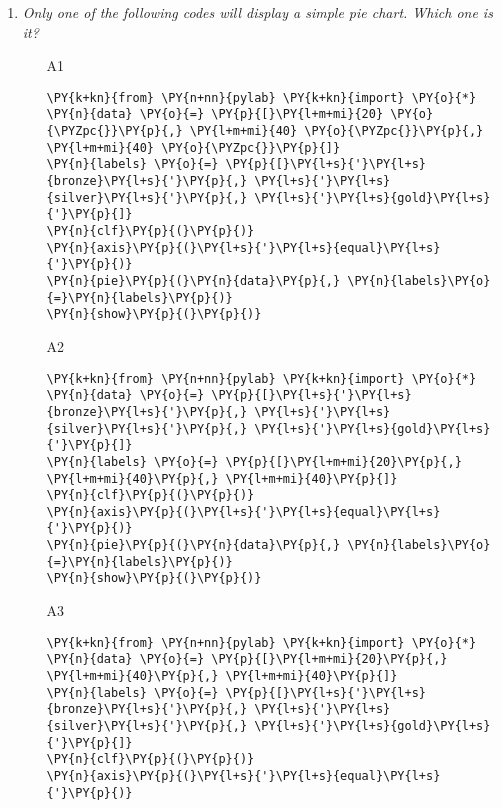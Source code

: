\begin{enumerate}
\vspace{6mm}

\item {\em Only one of the following codes will display a simple pie chart. Which one is it?}\\

\begin{enumerate}
\item[A1] 
\begin{Verbatim}[commandchars=\\\{\}]
\PY{k+kn}{from} \PY{n+nn}{pylab} \PY{k+kn}{import} \PY{o}{*}
\PY{n}{data} \PY{o}{=} \PY{p}{[}\PY{l+m+mi}{20} \PY{o}{\PYZpc{}}\PY{p}{,} \PY{l+m+mi}{40} \PY{o}{\PYZpc{}}\PY{p}{,} \PY{l+m+mi}{40} \PY{o}{\PYZpc{}}\PY{p}{]}
\PY{n}{labels} \PY{o}{=} \PY{p}{[}\PY{l+s}{'}\PY{l+s}{bronze}\PY{l+s}{'}\PY{p}{,} \PY{l+s}{'}\PY{l+s}{silver}\PY{l+s}{'}\PY{p}{,} \PY{l+s}{'}\PY{l+s}{gold}\PY{l+s}{'}\PY{p}{]}
\PY{n}{clf}\PY{p}{(}\PY{p}{)}
\PY{n}{axis}\PY{p}{(}\PY{l+s}{'}\PY{l+s}{equal}\PY{l+s}{'}\PY{p}{)}
\PY{n}{pie}\PY{p}{(}\PY{n}{data}\PY{p}{,} \PY{n}{labels}\PY{o}{=}\PY{n}{labels}\PY{p}{)}
\PY{n}{show}\PY{p}{(}\PY{p}{)}
\end{Verbatim}
\item[A2] 
\begin{Verbatim}[commandchars=\\\{\}]
\PY{k+kn}{from} \PY{n+nn}{pylab} \PY{k+kn}{import} \PY{o}{*}
\PY{n}{data} \PY{o}{=} \PY{p}{[}\PY{l+s}{'}\PY{l+s}{bronze}\PY{l+s}{'}\PY{p}{,} \PY{l+s}{'}\PY{l+s}{silver}\PY{l+s}{'}\PY{p}{,} \PY{l+s}{'}\PY{l+s}{gold}\PY{l+s}{'}\PY{p}{]}
\PY{n}{labels} \PY{o}{=} \PY{p}{[}\PY{l+m+mi}{20}\PY{p}{,} \PY{l+m+mi}{40}\PY{p}{,} \PY{l+m+mi}{40}\PY{p}{]}
\PY{n}{clf}\PY{p}{(}\PY{p}{)}
\PY{n}{axis}\PY{p}{(}\PY{l+s}{'}\PY{l+s}{equal}\PY{l+s}{'}\PY{p}{)}
\PY{n}{pie}\PY{p}{(}\PY{n}{data}\PY{p}{,} \PY{n}{labels}\PY{o}{=}\PY{n}{labels}\PY{p}{)}
\PY{n}{show}\PY{p}{(}\PY{p}{)}
\end{Verbatim}
\item[A3]
\begin{Verbatim}[commandchars=\\\{\}]
\PY{k+kn}{from} \PY{n+nn}{pylab} \PY{k+kn}{import} \PY{o}{*}
\PY{n}{data} \PY{o}{=} \PY{p}{[}\PY{l+m+mi}{20}\PY{p}{,} \PY{l+m+mi}{40}\PY{p}{,} \PY{l+m+mi}{40}\PY{p}{]}
\PY{n}{labels} \PY{o}{=} \PY{p}{[}\PY{l+s}{'}\PY{l+s}{bronze}\PY{l+s}{'}\PY{p}{,} \PY{l+s}{'}\PY{l+s}{silver}\PY{l+s}{'}\PY{p}{,} \PY{l+s}{'}\PY{l+s}{gold}\PY{l+s}{'}\PY{p}{]}
\PY{n}{clf}\PY{p}{(}\PY{p}{)}
\PY{n}{axis}\PY{p}{(}\PY{l+s}{'}\PY{l+s}{equal}\PY{l+s}{'}\PY{p}{)}

\end{Verbatim}
\end{enumerate}
\end{enumerate}
